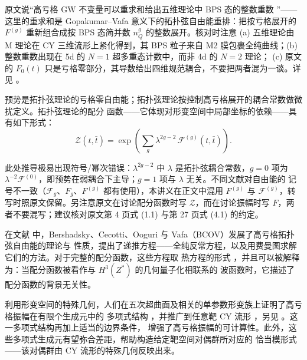 \begin{yizhu}[易错点]
原文说“高亏格 GW 不变量可以重求和给出五维理论中 BPS 态的整数重数 \cite{ref13,ref14}”——这里的重求和是
Gopakumar--Vafa 意义下的拓扑弦自由能重排：把按亏格展开的 $F^{(g)}$ 重新组合成按 BPS 态简并数
$n^g_Q$ 的整数展开。核对时注意 (a) 五维理论由 M 理论在 CY 三维流形上紧化得到，其 BPS 粒子来自
M2 膜包裹全纯曲线；(b) 整数重数出现在 5d 的 $N=1$ 超多重态计数中，而非 4d 的 $N=2$ 理论；
(c) 原文的 $F_0(t)$ 只是亏格零部分，其导数给出四维规范耦合，不要把两者混为一谈。详见 \cite{ref13,ref14}。
\end{yizhu}

预势是拓扑弦理论的亏格零自由能；拓扑弦理论按控制高亏格展开的耦合常数做微扰定义。拓扑弦理论的配分
函数——它体现对形变空间中局部坐标的依赖——具有如下形式：
\begin{equation}
  \mathcal{Z}(t,\bar t)
  = \exp\left(\sum_g \lambda^{2g-2}\,\mathcal{F}^{(g)}(t,\bar t)\right).
  \tag{1.1}
  \label{eq:1.1}
\end{equation}

\begin{yizhu}[易错点]
此处推导极易出现符号/幂次错误：$\lambda^{2g-2}$ 中 $\lambda$ 是拓扑弦耦合常数，$g=0$ 项为
$\lambda^{-2}\mathcal{F}^{(0)}$，即预势在弱耦合下主导；$g=1$ 项与 $\lambda$ 无关。不同文献对自由能的
记号不一致（$\mathcal{F}_g$、$F_g$、$F^{(g)}$ 都有使用），本讲义在正文中混用 $F^{(g)}$ 与
$\mathcal{F}^{(g)}$，转写时照原文保留。另注意原文在讨论配分函数时写 $\mathcal{Z}$，而在讨论振幅时写
$F$，两者不要混写；建议核对原文第 4 页式 (1.1) 与第 27 页式 (4.1) 的约定。
\end{yizhu}

在文献 \cite{ref18,ref19} 中，Bershadsky、Cecotti、Ooguri 与 Vafa（BCOV）发展了高亏格拓扑弦自由能的理论与
性质，提出了递推方程——全纯反常方程，以及用费曼图求解它们的方法。对于完整的配分函数，这些方程取
热方程的形式 \cite{ref19,ref20}，并且可以被解释 \cite{ref20} 为：当配分函数被看作与 $H^3(Z^*)$ 的几何量子化相联系的
波函数时，它描述了配分函数的背景无关性。

利用形变空间的特殊几何，人们在五次超曲面及相关的单参数形变族上证明了高亏格振幅在有限个生成元中的
多项式结构 \cite{ref21}，并推广到任意靶 CY 流形 \cite{ref22}，另见 \cite{ref23,ref24,ref25}。这一多项式结构再加上适当的边界条件，
增强了高亏格振幅的可计算性。此外，这些多项式生成元有望弥合差距，帮助构造给定靶空间对偶群所对应的
恰当模形式——该对偶群由 CY 流形的特殊几何反映出来。


